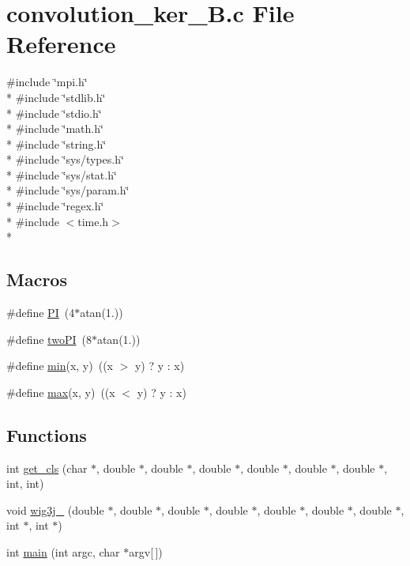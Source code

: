 \section{convolution\-\_\-ker\-\_\-\-B.\-c File Reference}
\label{convolution__ker__B_8c}
{\ttfamily \#include \char`\"{}mpi.\-h\char`\"{}}\\*
{\ttfamily \#include \char`\"{}stdlib.\-h\char`\"{}}\\*
{\ttfamily \#include \char`\"{}stdio.\-h\char`\"{}}\\*
{\ttfamily \#include \char`\"{}math.\-h\char`\"{}}\\*
{\ttfamily \#include \char`\"{}string.\-h\char`\"{}}\\*
{\ttfamily \#include \char`\"{}sys/types.\-h\char`\"{}}\\*
{\ttfamily \#include \char`\"{}sys/stat.\-h\char`\"{}}\\*
{\ttfamily \#include \char`\"{}sys/param.\-h\char`\"{}}\\*
{\ttfamily \#include \char`\"{}regex.\-h\char`\"{}}\\*
{\ttfamily \#include $<$time.\-h$>$}\\*
\subsection*{Macros}
\begin{DoxyCompactItemize}
\item 
\#define \hyperlink{convolution__ker__B_8c_a598a3330b3c21701223ee0ca14316eca}{P\-I}~(4$\ast$atan(1.))
\item 
\#define \hyperlink{convolution__ker__B_8c_a0a3527f8b23535fe43972fbe88c3cc0d}{two\-P\-I}~(8$\ast$atan(1.))
\item 
\#define \hyperlink{convolution__ker__B_8c_abb702d8b501669a23aa0ab3b281b9384}{min}(x, y)~((x $>$ y) ? y \-: x)
\item 
\#define \hyperlink{convolution__ker__B_8c_ac39d9cef6a5e030ba8d9e11121054268}{max}(x, y)~((x $<$ y) ? y \-: x)
\end{DoxyCompactItemize}
\subsection*{Functions}
\begin{DoxyCompactItemize}
\item 
int \hyperlink{convolution__ker__B_8c_add70c5428ae7e81c41c4c2360eb60543}{get\-\_\-cls} (char $\ast$, double $\ast$, double $\ast$, double $\ast$, double $\ast$, double $\ast$, double $\ast$, int, int)
\item 
void \hyperlink{convolution__ker__B_8c_af06278380393e21ff3f1bf4db83834b4}{wig3j\-\_\-} (double $\ast$, double $\ast$, double $\ast$, double $\ast$, double $\ast$, double $\ast$, double $\ast$, int $\ast$, int $\ast$)
\item 
int \hyperlink{convolution__ker__B_8c_a0ddf1224851353fc92bfbff6f499fa97}{main} (int argc, char $\ast$argv\mbox{[}$\,$\mbox{]})
\end{DoxyCompactItemize}


